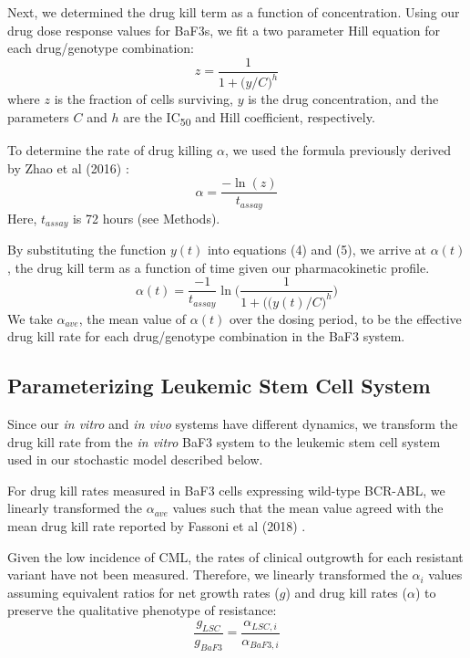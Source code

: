 \documentclass{article}
\begin{document}
Next, we determined the drug kill term as a function of concentration.  Using our drug dose response values for BaF3s, we fit a two parameter Hill equation for each drug/genotype combination:
\begin{equation}
z = \frac{1}{1+\Big(y/C\Big)^h}
\end{equation}
where $z$ is the fraction of cells surviving, $y$ is the drug concentration, and the parameters $C$ and $h$ are the IC\textsubscript{50} and Hill coefficient, respectively.

To determine the rate of drug killing $\alpha$, we used the formula previously derived by Zhao et al (2016) \cite{4}:
\begin{equation}
\alpha = \frac{-\ln(z)}{t_{assay}}
\end{equation}
Here, $t_{assay}$ is 72 hours (see Methods).

By substituting the function $y(t)$ into equations (4) and (5), we arrive at $\alpha(t)$, the drug kill term as a function of time given our pharmacokinetic profile.
\begin{equation}
\alpha(t) = \frac{-1}{t_{assay}} \ln\Bigg(\frac{1}{1+(\Big(y(t)/C\Big)^h}\Bigg)
\end{equation}
We take $\alpha_{ave}$, the mean value of $\alpha(t)$ over the dosing period, to be the effective drug kill rate for each drug/genotype combination in the BaF3 system.

\subsection{Parameterizing Leukemic Stem Cell System}

Since our \textit{in vitro} and \textit{in vivo} systems have different dynamics, we transform the drug kill rate from the \textit{in vitro} BaF3 system to the leukemic stem cell system used in our stochastic model described below.

For drug kill rates measured in BaF3 cells expressing wild-type BCR-ABL, we linearly transformed the $\alpha_{ave}$ values such that the mean value agreed with the mean drug kill rate reported by Fassoni et al (2018) \cite{5}.

Given the low incidence of CML, the rates of clinical outgrowth for each resistant variant have not been measured.  Therefore, we linearly transformed the $\alpha_i$ values assuming equivalent ratios for net growth rates ($g$) and drug kill rates ($\alpha$) to preserve the qualitative phenotype of resistance:
\begin{equation}
\frac{g_{LSC}}{g_{BaF3}} = \frac{\alpha_{LSC,i}}{\alpha_{BaF3,i}}
\end{equation}
\end{document}
